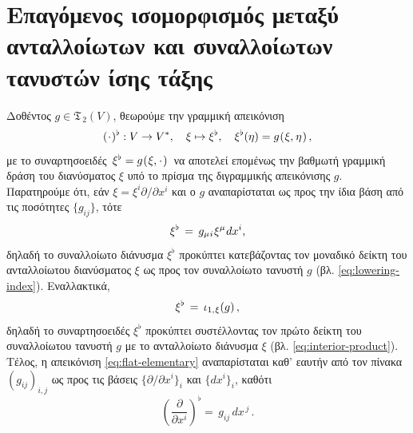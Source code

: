 \documentclass[11pt,a4paper,twoside,openright]{book}
\begin{document}
\section{Επαγόμενος ισομορφισμός μεταξύ ανταλλοίωτων και συναλλοίωτων τανυστών ίσης τάξης}
	\label{seq:induced-isomorphism-contravariance-covariance}

Δοθέντος $g \in \mathfrak{T}_{\,2}(V)$, θεωρούμε την γραμμική απεικόνιση
\begin{equation}\label{eq:flat-elementary}
(\hspace{.5pt}\cdot\hspace{.5pt})^\flat: V \to V^*,
\quad
\xi \mapsto \xi^\flat,
\quad
\xi^\flat(\eta) = g\hspace{.5pt}(\hspace{.5pt}\xi,\hspace{.5pt}\eta\hspace{.7pt})\,,
\end{equation}
με το συναρτησοειδές $\,\xi^\flat = g\hspace{.5pt}(\hspace{.5pt}\xi,\hspace{.5pt}\cdot\hspace{.75pt})\,$ να αποτελεί επομένως την βαθμωτή γραμμική δράση του διανύσματος $\xi$ υπό το πρίσμα της διγραμμικής απεικόνισης $g$. Παρατηρούμε ότι, εάν
$\xi = \xi^i \partial/\partial x^i$ και ο $g$ αναπαρίσταται
ως προς την ίδια βάση από τις ποσότητες $\{g_{ij}\}$, τότε
\begin{equation}\label{eq:flat-elementary-as-lowering}
\xi^\flat
\,=\,
g_{\mu\hspace{.5pt}i}\hspace{.5pt}\xi^\mu\hspace{.5pt}dx^i,
\end{equation}
δηλαδή το συναλλοίωτο διάνυσμα $\xi^\flat$ προκύπτει κατεβάζοντας τον μοναδικό δείκτη του ανταλλοίωτου διανύσματος $\xi$ ως προς τον συναλλοίωτο τανυστή $g$ (βλ. \eqref{eq:lowering-index}).
Εναλλακτικά,
\begin{equation}\label{eq:flat-as-interior-product}
\xi^\flat\,=\,\iota_{1,\hspace{.5pt}\xi}(g)\,,
\end{equation}
δηλαδή το συναρτησοειδές $\xi^\flat$
προκύπτει συστέλλοντας τον πρώτο δείκτη του συναλλοίωτου τανυστή $g$ με το ανταλλοίωτο διάνυσμα $\xi$ (βλ. \eqref{eq:interior-product}). Τέλος, η απεικόνιση \eqref{eq:flat-elementary} αναπαρίσταται καθ' εαυτήν από τον πίνακα $(g_{ij})_{i,j}$ ως προς τις βάσεις $\{\partial/\partial x^i\}_i$ και $\{dx^i\}_i$, καθότι
\begin{equation}\label{eq:flat-elementary-base-mapping}
\left(\frac{\partial}{\partial x^i}\right)^\flat =\, g_{ij}\,dx^{\,j}\,.
\end{equation}
\end{document}
